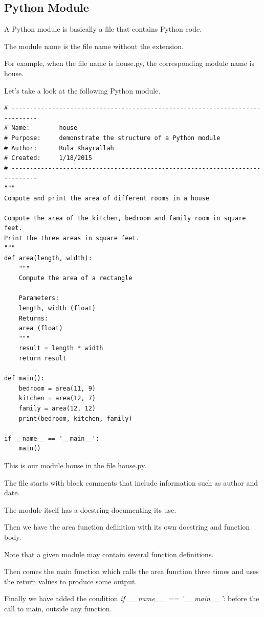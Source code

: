 \documentclass{article}
\begin{document}
\subsection{Python Module}

A Python module is basically a file that contains Python code.  

The module name is the file name without the extension.

For example, when the file name is house.py, the corresponding module name is house.  

Let's  take a look at the following Python module.

\begin{lstlisting}
# -----------------------------------------------------------------------------
# Name:        house
# Purpose:     demonstrate the structure of a Python module
# Author:      Rula Khayrallah
# Created:     1/18/2015
# -----------------------------------------------------------------------------
"""
Compute and print the area of different rooms in a house

Compute the area of the kitchen, bedroom and family room in square feet.
Print the three areas in square feet.
"""
def area(length, width):
    """
    Compute the area of a rectangle

    Parameters:
    length, width (float)
    Returns:
    area (float)
    """
    result = length * width
    return result

def main():
    bedroom = area(11, 9)
    kitchen = area(12, 7)
    family = area(12, 12)
    print(bedroom, kitchen, family)

if __name__ == '__main__':
    main()
\end{lstlisting}
 
This is our module house in the file house.py.

The file starts with block comments that include information such as author and date.

The module itself has a docstring documenting its use.

Then we have the area function definition with its own docstring and function body.

Note that a given module may contain several function definitions.

Then comes the main function which calls the area function three times and uses the return values to produce some output.

Finally we have added the condition \textit{if {\_}{\_}name{\_}{\_} == '{\_}{\_}main{\_}{\_}':}  before the call to main, outside any function.
\end{document}
